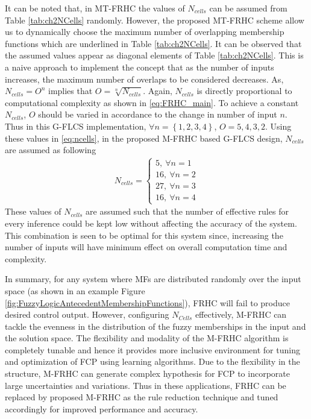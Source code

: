 It can be noted that, in MT-FRHC the values of $ N_{cells} $ can be assumed from Table \ref{tab:ch2NCells} randomly. However, the proposed MT-FRHC scheme allow us to dynamically choose the maximum number of overlapping membership functions which are underlined in Table \ref{tab:ch2NCells}. It can be observed that the assumed values appear as diagonal elements of Table \ref{tab:ch2NCells}. This is a naive approach to implement the concept that as the number of inputs increases, the maximum number of overlaps to be considered decreases.
As, $N_{cells} = {O^n}$ implies that $O = \sqrt[n]{{N_{cells}}}$. Again, $ N_{cells} $ is directly proportional to computational complexity as shown in \eqref{eq:FRHC_main}.
To achieve a constant $ N_{cells} $, $ O $ should be varied in accordance to the change in number of input $ n $. Thus in this G-FLCS implementation, $ \forall n = \left\{ {1,2,3,4} \right\} $, $ O={5,4,3,2} $. Using these values in \eqref{eq:ncells}, in the proposed M-FRHC based G-FLCS design, $ N_{cells} $ are assumed as following 
\begin{align}
N_{cells} = \left\{\begin{matrix}
5,~\forall n = 1\\ 
16,~\forall n = 2\\ 
27,~\forall n = 3\\ 
16,~\forall n = 4
\end{matrix}\right. \nonumber
\end{align} 
These values of $ N_{cells} $ are assumed such that the number of effective rules for every inference could be kept low without affecting the accuracy of the system. This combination is seen to be optimal for this system since, increasing the number of inputs will have minimum effect on overall computation time and complexity. 

In summary, for any system where MFs are distributed randomly over the input space (as shown in an example Figure \ref{fig:FuzzyLogicAntecedentMembershipFunctions}), FRHC will fail to produce desired control output. However, configuring $N_{Cells}$ effectively, M-FRHC can tackle the evenness in the distribution of the fuzzy memberships in the input and the solution space. The flexibility and modality of the M-FRHC algorithm is completely tunable and hence it provides more inclusive environment for tuning and optimization of FCP using learning algorithms. Due to the flexibility in the structure, M-FRHC can generate complex hypothesis for FCP to incorporate large uncertainties and variations. Thus in these applications, FRHC can be replaced by proposed M-FRHC as the rule reduction technique and tuned accordingly for improved performance and accuracy. 

